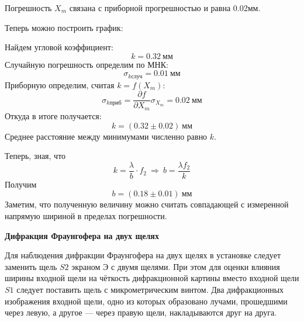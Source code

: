 \documentclass[14pt]{article}
\begin{document}
Погрешность $X_m$ связана с приборной прогрешностью и равна 0.02мм.

Теперь можно построить график:

\begin{flushleft}
\end{flushleft}

Найдем угловой коэффициент:
$$
	k = 0.32~\text{мм}
$$
Случайную погрешность определим по МНК:
$$
	\sigma_{k\text{случ}} = 0.01~\text{мм}
$$
Приборную определим, считая $k = f(X_m)$:
$$
	\sigma_{k\text{приб}} = \frac{\partial f}{\partial X_m}\sigma_{X_m} = 0.02~\text{мм}
$$
Откуда в итоге получается:
$$
	k = (0.32 \pm 0.02)~\text{мм}
$$
Среднее расстояние между минимумами численно равно $k$.

Теперь, зная, что
$$
	k = \frac{\lambda}{b}\cdot f_2~\Rightarrow~ b = \frac{\lambda f_2}{k}
$$
Получим
$$
	b = (0.18 \pm 0.01)~\text{мм}
$$
Заметим, что полученную величину можно считать совпадающей с измеренной напрямую шириной в пределах погрешности. 

\vspace{1cm}
\textbf{Дифракция Фраунгофера на двух щелях}

Для наблюдения дифракции Фраунгофера на двух щелях в установке следует заменить щель $S2$ экраном Э с двумя щелями. При этом для оценки влияния ширины входной щели на чёткость дифракционной картины вместо входной щели $S1$ следует поставить щель с микрометрическим винтом. Два дифракционных изображения входной щели, одно из которых образовано лучами, прошедшими через левую, а другое — через правую щели, накладываются друг на друга.
\end{document}
